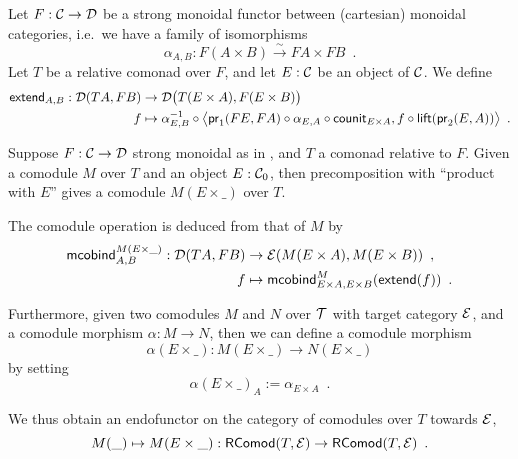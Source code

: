 \documentclass{amsart}
\begin{document}
\begin{definition}\label{def:extend}
 Let $F : \C\to \D$ be a strong monoidal functor between (cartesian) monoidal categories, 
 i.e.\ we have a family of isomorphisms
  \[ \alpha_{A,B} : F(A\times B) \stackrel{\sim}{\to} FA\times FB\enspace . \] 
  Let $T$ be a relative comonad over $F$, and let $E : \C$ be an object of $\C$.
 We define
 \begin{align*} \extend_{A,B} : \D(TA,FB) &\to \D\bigl(T(E\times A),F(E\times B)\bigr)\\
                                   f   &\mapsto \comp{\bigl\langle \comp{\counit_{E\times A}}{\comp{\alpha_{E,A}}{\pr_1(FE,FA)}}, \comp{\lift(\pr_2(E,A))}{f} \bigr\rangle}{\alpha_{E,B}^{-1}} \enspace .
\end{align*}



\end{definition}



\begin{definition}\label{def:product_in_context}
 Suppose $F:\C\to\D$ strong monoidal as in , and $T$ a comonad relative to $F$.
 Given a comodule $M$ over $T$ and an object $E:\C_0$, then precomposition with \enquote{product with $E$}
 gives a comodule $M(E\times\_)$ over $T$.
 
 The comodule operation is deduced from that of $M$ by 
 \begin{align*} \mcobind^{M(E\times\_)}_{A,B} : \D(TA,FB)&\to \E(M(E\times A), M(E\times B)) \enspace ,\\
                                                      f &\mapsto \mcobind^M_{E\times A,E\times B}(\extend(f)) \enspace .
  \end{align*}                                        

 \noindent
 Furthermore, given two comodules $M$ and $N$ over $\T$ with target category $\E$, and a comodule morphism $\alpha : M \to N$, then 
 we can define a comodule morphism \[\alpha(E\times \_) : M(E\times \_) \to N(E\times \_) \] by setting
          \[ \alpha(E \times \_)_A := \alpha_{E\times A} \enspace . \]
  
  \noindent
  We thus obtain an endofunctor on the category of comodules over $T$ towards $\E$,
   \[ M(\_) \mapsto  M (E\times \_) : \RComod(T,\E) \to \RComod(T,\E) \enspace . \]
 

\end{definition}
\end{document}
